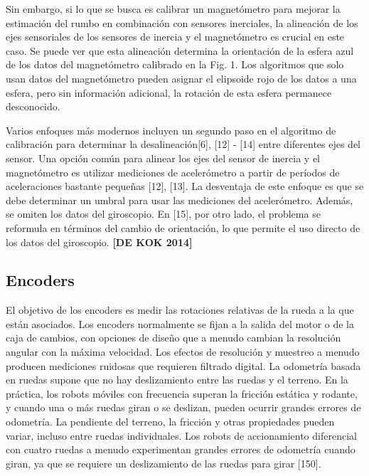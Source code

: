 Sin embargo, si lo que se busca es calibrar un magnetómetro para mejorar la estimación del rumbo en combinación con sensores inerciales, la alineación de los ejes sensoriales de los sensores de inercia y el magnetómetro es crucial en este caso. Se puede ver que esta alineación determina la orientación de la esfera azul de los datos del magnetómetro calibrado en la Fig. 1. Los algoritmos que solo usan datos del magnetómetro pueden asignar el elipsoide rojo de los datos a una esfera, pero sin información adicional, la rotación de esta esfera permanece desconocido.

Varios enfoques más modernos incluyen un segundo paso en el algoritmo de calibración para determinar la desalineación[6], [12] - [14] entre diferentes ejes del sensor. Una opción común para alinear los ejes del sensor de inercia y el magnetómetro es utilizar mediciones de acelerómetro a partir de períodos de aceleraciones bastante pequeñas [12], [13]. La desventaja de este enfoque es que se debe determinar un umbral para usar las mediciones del acelerómetro. Además, se omiten los datos del giroscopio. En [15], por otro lado, el problema se reformula en términos del cambio de orientación, lo que permite el uso directo de los datos del giroscopio. \textbf{[DE KOK 2014]}
\fi

\subsection{Encoders}
El objetivo de los encoders es medir las rotaciones relativas de la rueda a la que están asociados. Los encoders normalmente se fijan a la salida del motor o de la caja de cambios, con opciones de diseño que a menudo cambian la resolución angular con la máxima velocidad. Los efectos de resolución y muestreo a menudo producen mediciones ruidosas que requieren filtrado digital. La odometría basada en ruedas supone que no hay deslizamiento entre las ruedas y el terreno. En la práctica, los robots móviles con frecuencia superan la fricción estática y rodante, y cuando una o más ruedas giran o se deslizan, pueden ocurrir grandes errores de odometría. La pendiente del terreno, la fricción y otras propiedades pueden variar, incluso entre ruedas individuales. Los robots de accionamiento diferencial con cuatro ruedas a menudo experimentan grandes errores de odometría cuando giran, ya que se requiere un deslizamiento de las ruedas para girar [150].

